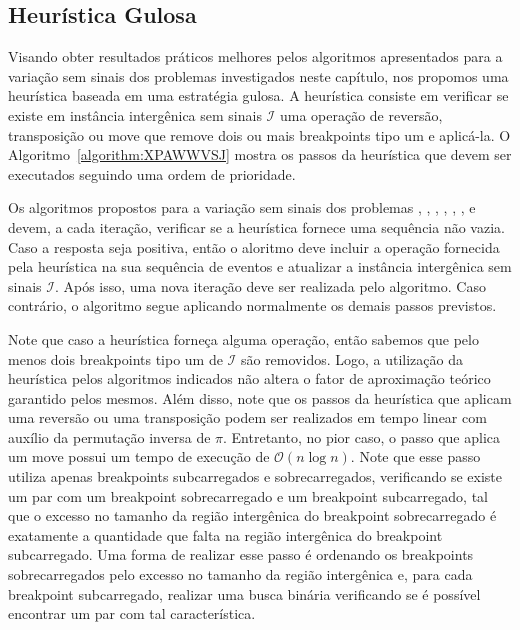 \subsection{Heurística Gulosa}

Visando obter resultados práticos melhores pelos algoritmos apresentados para a variação sem sinais dos problemas investigados neste capítulo, nos propomos uma heurística baseada em uma estratégia gulosa. A heurística consiste em verificar se existe em instância intergênica sem sinais $\mathcal{I}$ uma operação de reversão, transposição ou move que remove dois ou mais breakpoints tipo um e aplicá-la. O Algoritmo~\ref{algorithm:XPAWWVSJ} mostra os passos da heurística que devem ser executados seguindo uma ordem de prioridade.  



Os algoritmos propostos para a variação sem sinais dos problemas \SbIR{}, \SbIRI{}, \SbIRM{}, \SbIRMI{}, \SbIRT{}, \SbIRTI{}, \SbIRTM{} e \SbIRTMI{} devem, a cada iteração, verificar se a heurística fornece uma sequência não vazia. Caso a resposta seja positiva, então o aloritmo deve incluir a operação fornecida pela heurística na sua sequência de eventos e atualizar a instância intergênica sem sinais $\mathcal{I}$. Após isso, uma nova iteração deve ser realizada pelo algoritmo. Caso contrário, o algoritmo segue aplicando normalmente os demais passos previstos.

Note que caso a heurística forneça alguma operação, então sabemos que pelo menos dois breakpoints tipo um de $\mathcal{I}$ são removidos. Logo, a utilização da heurística pelos algoritmos indicados não altera o fator de aproximação teórico garantido pelos mesmos. Além disso, note que os passos da heurística que aplicam uma reversão ou uma transposição podem ser realizados em tempo linear com auxílio da permutação inversa de $\pi$. Entretanto, no pior caso, o passo que aplica um move possui um tempo de execução de $\mathcal{O}(n\log n)$. Note que esse passo utiliza apenas breakpoints subcarregados e sobrecarregados, verificando se existe um par com um breakpoint sobrecarregado e um breakpoint subcarregado, tal que o excesso no tamanho da região intergênica do breakpoint sobrecarregado é exatamente a quantidade que falta na região intergênica do breakpoint subcarregado. Uma forma de realizar esse passo é ordenando os breakpoints sobrecarregados pelo excesso no tamanho da região intergênica e, para cada breakpoint subcarregado, realizar uma busca binária verificando se é possível encontrar um par com tal característica.

